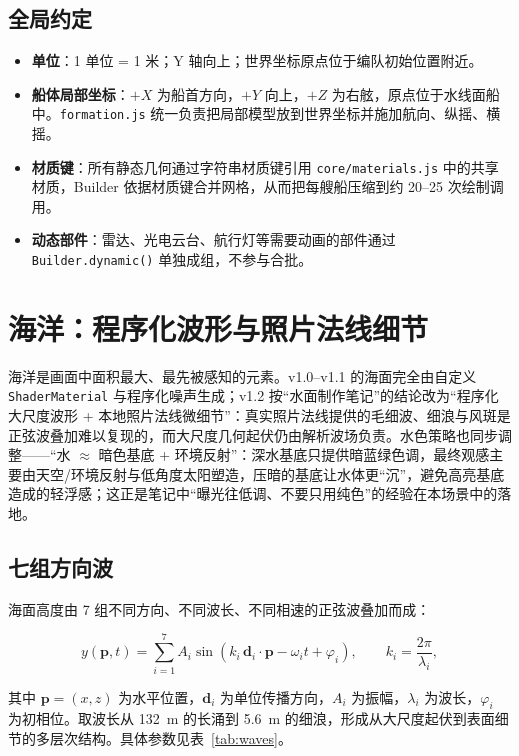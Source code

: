 \documentclass[UTF8, a4paper, 11pt]{ctexart}
\newcommand{\file}[1]{\texttt{#1}}
\begin{document}
\subsection{全局约定}

\begin{itemize}
  \item \textbf{单位}：1 单位 = 1 米；Y 轴向上；世界坐标原点位于编队初始位置附近。
  \item \textbf{船体局部坐标}：$+X$ 为船首方向，$+Y$ 向上，$+Z$ 为右舷，原点位于水线面船中。\file{formation.js} 统一负责把局部模型放到世界坐标并施加航向、纵摇、横摇。
  \item \textbf{材质键}：所有静态几何通过字符串材质键引用 \file{core/materials.js} 中的共享材质，Builder 依据材质键合并网格，从而把每艘船压缩到约 20--25 次绘制调用。
  \item \textbf{动态部件}：雷达、光电云台、航行灯等需要动画的部件通过 \file{Builder.dynamic()} 单独成组，不参与合批。
\end{itemize}

\section{海洋：程序化波形与照片法线细节}

海洋是画面中面积最大、最先被感知的元素。v1.0--v1.1 的海面完全由自定义 \texttt{ShaderMaterial} 与程序化噪声生成；v1.2 按“水面制作笔记”的结论改为“程序化大尺度波形 + 本地照片法线微细节”：真实照片法线提供的毛细波、细浪与风斑是正弦波叠加难以复现的，而大尺度几何起伏仍由解析波场负责。水色策略也同步调整——“水 $\approx$ 暗色基底 + 环境反射”：深水基底只提供暗蓝绿色调，最终观感主要由天空/环境反射与低角度太阳塑造，压暗的基底让水体更“沉”，避免高亮基底造成的轻浮感；这正是笔记中“曝光往低调、不要只用纯色”的经验在本场景中的落地。

\subsection{七组方向波}

海面高度由 7 组不同方向、不同波长、不同相速的正弦波叠加而成：

\begin{equation}
y(\mathbf{p}, t)=\sum_{i=1}^{7} A_i \sin\!\left(k_i\,\mathbf{d}_i\cdot\mathbf{p}-\omega_i t+\varphi_i\right),
\qquad k_i=\frac{2\pi}{\lambda_i},
\label{eq:waves}
\end{equation}

其中 $\mathbf{p}=(x,z)$ 为水平位置，$\mathbf{d}_i$ 为单位传播方向，$A_i$ 为振幅，$\lambda_i$ 为波长，$\varphi_i$ 为初相位。取波长从 132~m 的长涌到 5.6~m 的细浪，形成从大尺度起伏到表面细节的多层次结构。具体参数见表~\ref{tab:waves}。
\end{document}
